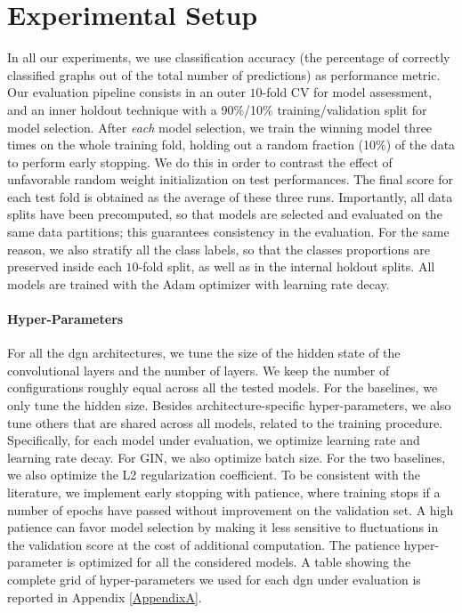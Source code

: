 \section{Experimental Setup}\label{sec:comparison-exp-setup}
In all our experiments, we use classification accuracy (\ie the percentage of correctly classified graphs out of the total number of predictions) as performance metric.
Our evaluation pipeline consists in an outer $10$-fold CV for model assessment, and an inner holdout technique with a 90\%/10\% training/validation split for model selection. After \emph{each} model selection, we train the winning model three times on the whole training fold, holding out a random fraction (10\%) of the data to perform early stopping. We do this in order to contrast the effect of unfavorable random weight initialization on test performances. The final score for each test fold is obtained as the average of these three runs. Importantly, all data splits have been precomputed, so that models are selected and evaluated on the same data partitions; this guarantees consistency in the evaluation. For the same reason, we also stratify all the class labels, so that the classes proportions are preserved inside each $10$-fold split, as well as in the internal holdout splits.  All models are trained with the Adam \citep{kingma2015adam} optimizer with learning rate decay.

\paragraph{Hyper-Parameters}
For all the \gls{dgn} architectures, we tune the size of the hidden state of the convolutional layers and the number of layers. We keep the number of configurations roughly equal across all the tested models. For the baselines, we only tune the hidden size. Besides architecture-specific hyper-parameters, we also tune others that are shared across all models, related to the training procedure. Specifically, for each model under evaluation, we optimize learning rate and learning rate decay. For GIN, we also optimize batch size. For the two baselines, we also optimize the L2 regularization coefficient. To be consistent with the literature, we implement early stopping with patience, where training stops if a number of epochs have passed without improvement on the validation set. A high patience can favor model selection by making it less sensitive to fluctuations in the validation score at the cost of additional computation. The patience hyper-parameter is optimized for all the considered models. A table showing the complete grid of hyper-parameters we used for each \gls{dgn} under evaluation is reported in Appendix \ref{AppendixA}.

